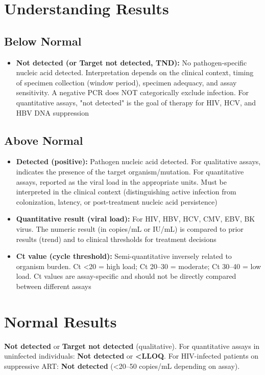 \section*{Understanding Results}

\subsection*{Below Normal}
\begin{itemize}
  \item \textbf{Not detected (or Target not detected, TND):} No pathogen-specific nucleic acid detected. Interpretation depends on the clinical context, timing of specimen collection (window period), specimen adequacy, and assay sensitivity. A negative PCR does NOT categorically exclude infection. For quantitative assays, "not detected" is the goal of therapy for HIV, HCV, and HBV DNA suppression
\end{itemize}

\subsection*{Above Normal}
\begin{itemize}
  \item \textbf{Detected (positive):} Pathogen nucleic acid detected. For qualitative assays, indicates the presence of the target organism/mutation. For quantitative assays, reported as the viral load in the appropriate units. Must be interpreted in the clinical context (distinguishing active infection from colonization, latency, or post-treatment nucleic acid persistence)
  \item \textbf{Quantitative result (viral load):} For HIV, HBV, HCV, CMV, EBV, BK virus. The numeric result (in copies/mL or IU/mL) is compared to prior results (trend) and to clinical thresholds for treatment decisions
  \item \textbf{Ct value (cycle threshold):} Semi-quantitative inversely related to organism burden. Ct <20 = high load; Ct 20--30 = moderate; Ct 30--40 = low load. Ct values are assay-specific and should not be directly compared between different assays
\end{itemize}

\section*{Normal Results}
\textbf{Not detected} or \textbf{Target not detected} (qualitative). For quantitative assays in uninfected individuals: \textbf{Not detected} or \textbf{<LLOQ}. For HIV-infected patients on suppressive ART: \textbf{Not detected} (<20--50 copies/mL depending on assay).

